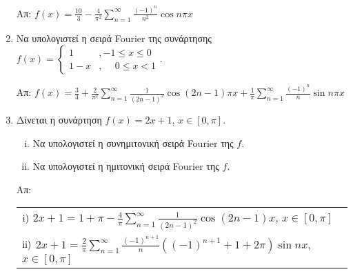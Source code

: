 \begin{enumerate}
	\hfill Απ: $ f(x) = \frac{10}{3} - \frac{4}{\pi ^{2}} \sum_{n=1}^{\infty} \frac{(-1)^{n}}{n^{2}}
	\cos{n \pi x}  $ 

\item Να υπολογιστεί η σειρά \textlatin{Fourier} της συνάρτησης $ f(x) = \begin{cases} 
   1 &, -1 \leq x \leq 0 \\
   1-x &, \phantom{-}0 \leq x <1
   \end{cases} $.

   \hfill Απ: $ f(x) = \frac{3}{4} + \frac{2}{\pi ^{2}} \sum_{n=1}^{\infty} \frac{1}{(2n-1)^{2}}
   \cos{(2n-1) \pi x} + \frac{1}{\pi} \sum_{n=1}^{\infty} \frac{(-1)^{n}}{n} \sin{n \pi x}   $ 

   \item Δίνεται η συνάρτηση $ f(x) = 2x+1 $, $ x \in [0, \pi] $.

	   \begin{enumerate}[i)]
		   \item Να υπολογιστεί η συνημιτονική σειρά \textlatin{Fourier} της $f$.
		   \item Να υπολογιστεί η ημιτονική σειρά \textlatin{Fourier} της $f$.
	   \end{enumerate}

	   \hfill Απ: \begin{tabular}{l}
		   $\rm i)$ $ 2x+1 = 1 + \pi - \frac{4}{\pi} \sum_{n=1}^{\infty}
		   \frac{1}{(2n-1)^{2}}\cos{(2n-1)x} $, $ x \in [0, \pi] $ \\
		   $\rm ii)$ $  2x+1 = \frac{2}{\pi} \sum_{n=1}^{\infty} \frac{(-1)^{n+1}}{n} \left((-1)^{n+1}+1+2 \pi\right)
		   \sin{nx} $, $ x \in [0, \pi] $
	   \end{tabular} 

\end{enumerate}


   
